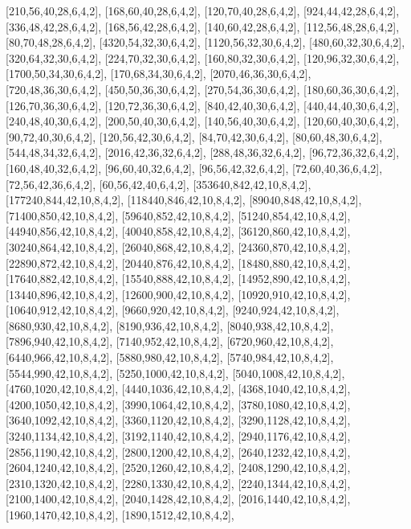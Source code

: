 \documentclass[12pt]{amsart}
\begin{document}
[210,56,40,28,6,4,2],   [168,60,40,28,6,4,2],   [120,70,40,28,6,4,2],   [924,44,42,28,6,4,2],   [336,48,42,28,6,4,2],   [168,56,42,28,6,4,2],   [140,60,42,28,6,4,2],
[112,56,48,28,6,4,2],   [80,70,48,28,6,4,2],   [4320,54,32,30,6,4,2],   [1120,56,32,30,6,4,2],   [480,60,32,30,6,4,2],   [320,64,32,30,6,4,2],   [224,70,32,30,6,4,2],
[160,80,32,30,6,4,2],   [120,96,32,30,6,4,2],   [1700,50,34,30,6,4,2],   [170,68,34,30,6,4,2],   [2070,46,36,30,6,4,2],   [720,48,36,30,6,4,2],   [450,50,36,30,6,4,2],
[270,54,36,30,6,4,2],   [180,60,36,30,6,4,2],   [126,70,36,30,6,4,2],   [120,72,36,30,6,4,2],   [840,42,40,30,6,4,2],   [440,44,40,30,6,4,2],   [240,48,40,30,6,4,2],
[200,50,40,30,6,4,2],   [140,56,40,30,6,4,2],   [120,60,40,30,6,4,2],   [90,72,40,30,6,4,2],   [120,56,42,30,6,4,2],   [84,70,42,30,6,4,2],   [80,60,48,30,6,4,2],
[544,48,34,32,6,4,2],   [2016,42,36,32,6,4,2],   [288,48,36,32,6,4,2],   [96,72,36,32,6,4,2],   [160,48,40,32,6,4,2],   [96,60,40,32,6,4,2],   [96,56,42,32,6,4,2],
[72,60,40,36,6,4,2],   [72,56,42,36,6,4,2],   [60,56,42,40,6,4,2],   [353640,842,42,10,8,4,2],   [177240,844,42,10,8,4,2],   [118440,846,42,10,8,4,2],
[89040,848,42,10,8,4,2],   [71400,850,42,10,8,4,2],   [59640,852,42,10,8,4,2],   [51240,854,42,10,8,4,2],   [44940,856,42,10,8,4,2],   [40040,858,42,10,8,4,2],
[36120,860,42,10,8,4,2],   [30240,864,42,10,8,4,2],   [26040,868,42,10,8,4,2],   [24360,870,42,10,8,4,2],   [22890,872,42,10,8,4,2],   [20440,876,42,10,8,4,2],
[18480,880,42,10,8,4,2],   [17640,882,42,10,8,4,2],   [15540,888,42,10,8,4,2],   [14952,890,42,10,8,4,2],   [13440,896,42,10,8,4,2],   [12600,900,42,10,8,4,2],
[10920,910,42,10,8,4,2],   [10640,912,42,10,8,4,2],   [9660,920,42,10,8,4,2],   [9240,924,42,10,8,4,2],   [8680,930,42,10,8,4,2],   [8190,936,42,10,8,4,2],
[8040,938,42,10,8,4,2],   [7896,940,42,10,8,4,2],   [7140,952,42,10,8,4,2],   [6720,960,42,10,8,4,2],   [6440,966,42,10,8,4,2],   [5880,980,42,10,8,4,2],
[5740,984,42,10,8,4,2],   [5544,990,42,10,8,4,2],   [5250,1000,42,10,8,4,2],   [5040,1008,42,10,8,4,2],   [4760,1020,42,10,8,4,2],   [4440,1036,42,10,8,4,2],
[4368,1040,42,10,8,4,2],   [4200,1050,42,10,8,4,2],   [3990,1064,42,10,8,4,2],   [3780,1080,42,10,8,4,2],   [3640,1092,42,10,8,4,2],   [3360,1120,42,10,8,4,2],
[3290,1128,42,10,8,4,2],   [3240,1134,42,10,8,4,2],   [3192,1140,42,10,8,4,2],   [2940,1176,42,10,8,4,2],   [2856,1190,42,10,8,4,2],   [2800,1200,42,10,8,4,2],
[2640,1232,42,10,8,4,2],   [2604,1240,42,10,8,4,2],   [2520,1260,42,10,8,4,2],   [2408,1290,42,10,8,4,2],   [2310,1320,42,10,8,4,2],   [2280,1330,42,10,8,4,2],
[2240,1344,42,10,8,4,2],   [2100,1400,42,10,8,4,2],   [2040,1428,42,10,8,4,2],   [2016,1440,42,10,8,4,2],   [1960,1470,42,10,8,4,2],   [1890,1512,42,10,8,4,2],
\end{document}
